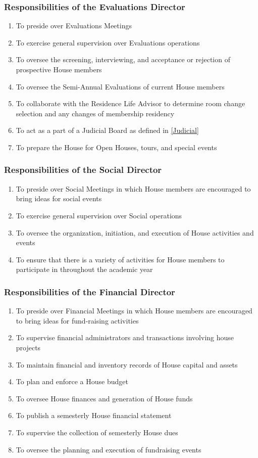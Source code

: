 \documentclass{article}
\newcommand{\asubsection}[1]{\subsubsection{#1} \label{#1}}
\begin{document}
\asubsection{Responsibilities of the Evaluations Director}
\begin{enumerate}
	\item To preside over Evaluations Meetings
	\item To exercise general supervision over Evaluations operations
	\item To oversee the screening, interviewing, and acceptance or rejection of prospective House members
	\item To oversee the Semi-Annual Evaluations of current House members
	\item To collaborate with the Residence Life Advisor to determine room change selection and any changes of membership residency
	\item To act as a part of a Judicial Board as defined in \ref{Judicial}
	\item To prepare the House for Open Houses, tours, and special events
\end{enumerate}

\asubsection{Responsibilities of the Social Director}
\begin{enumerate}
	\item To preside over Social Meetings in which House members are encouraged to bring ideas for social events
	\item To exercise general supervision over Social operations
	\item To oversee the organization, initiation, and execution of House activities and events
	\item To ensure that there is a variety of activities for House members to participate in throughout the academic year
\end{enumerate}

\asubsection{Responsibilities of the Financial Director}
\begin{enumerate}
	\item To preside over Financial Meetings in which House members are encouraged to bring ideas for fund-raising activities
	\item To supervise financial administrators and transactions involving house projects
	\item To maintain financial and inventory records of House capital and assets
	\item To plan and enforce a House budget
	\item To oversee House finances and generation of House funds
	\item To publish a semesterly House financial statement
	\item To supervise the collection of semesterly House dues
	\item To oversee the planning and execution of fundraising events
\end{enumerate}
\end{document}
